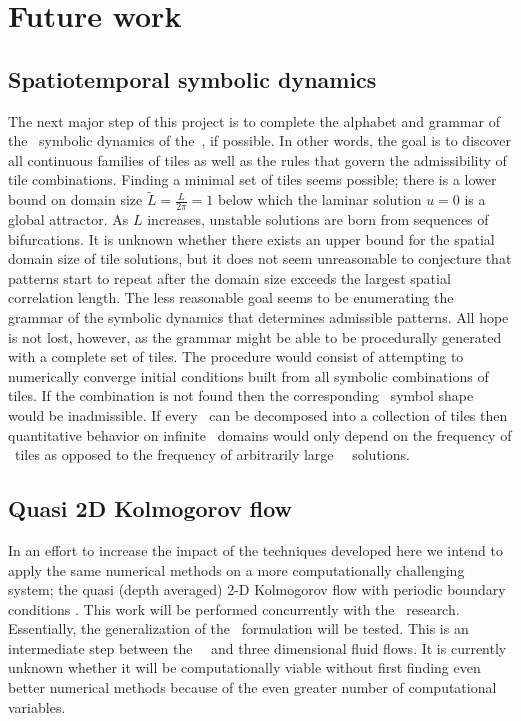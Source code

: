\newpage
\section{Future work}
\label{section:future}


\subsection{Spatiotemporal symbolic dynamics}
\label{subsection:symbolic}
The next major step of this project is to complete the alphabet and grammar of the \spt\ symbolic dynamics of the \KSe\,, if possible.
In other words, the goal is to discover all continuous families of tiles as well as the rules that govern the admissibility of tile combinations.
Finding a minimal set of tiles seems possible; there is a lower bound on domain size $\tilde{L} = \frac{L}{2\pi} = 1$ below which the laminar solution $u=0$ is a global attractor.
As $L$ increases, unstable solutions are born from sequences of bifurcations. It is unknown whether there exists
an upper bound for the spatial domain size of tile solutions, but it does not seem unreasonable to conjecture that patterns start
to repeat after the domain size exceeds the largest spatial correlation length.
The less reasonable goal seems to be enumerating the grammar of the symbolic dynamics that determines admissible patterns.
All hope is not lost, however, as the grammar might be able to be procedurally generated with a complete set of tiles.
The procedure would consist of attempting to
numerically converge initial conditions built from all symbolic combinations of tiles.
If the combination is not found then the corresponding \spt\ symbol shape would be inadmissible.
If every \twot\ can be decomposed into a collection of tiles then quantitative behavior on infinite \spt\ domains
would only depend on the frequency of \spt\ tiles as opposed to the frequency of arbitrarily large
\spt\ \twot\ solutions.

\subsection{Quasi 2D Kolmogorov flow}
In an effort to increase the impact of the techniques developed here we intend to apply the same numerical
methods on a more computationally challenging system; the quasi (depth averaged) 2-D Kolmogorov flow with periodic boundary conditions
. This work will be performed concurrently with the \KSe\ research. Essentially,  the generalization of the \spt\ formulation
will be tested. This is an intermediate step between the \spt\ \KSe\ and three dimensional fluid flows. It is currently unknown whether
it will be computationally viable without first finding even better numerical methods because of the even greater number of computational
variables.
